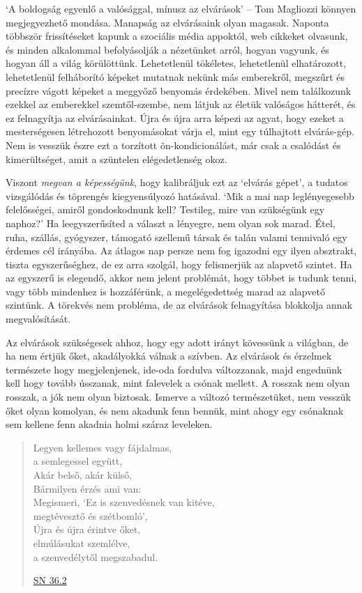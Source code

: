 `A boldogság egyenlő a valósággal, mínusz az elvárások' -- Tom Magliozzi
könnyen megjegyezhető mondása. Manapság az elvárásaink olyan magasak.
Naponta többször frissítéseket kapunk a szociális média appoktól, web
cikkeket olvasunk, és minden alkalommal befolyásolják a nézetünket
arról, hogyan vagyunk, és hogyan áll a világ körülöttünk. Lehetetlenül
tökéletes, lehetetlenül elhatározott, lehetetlenül felháborító képeket
mutatnak nekünk más emberekről, megszűrt és precízre vágott képeket a
meggyőző benyomás érdekében. Mivel nem találkozunk ezekkel az emberekkel
szemtől-szembe, nem látjuk az életük valóságos hátterét, és ez
felnagyítja az elvárásainkat. Újra és újra arra képezi az agyat, hogy
ezeket a mesterségesen létrehozott benyomásokat várja el, mint egy
túlhajtott elvárás-gép. Nem is vesszük észre ezt a torzított
ön-kondicionálást, már csak a csalódást és kimerültséget, amit a
szüntelen elégedetlenség okoz.

Viszont \emph{megvan a képességünk}, hogy kalibráljuk ezt az `elvárás
gépet', a tudatos vizsgálódás és töprengés kiegyensúlyozó hatásával.
`Mik a mai nap leglényegesebb felelősségei, amiről gondoskodnunk kell?
Testileg, mire van szükségünk egy naphoz?' Ha leegyszerűsíted a választ
a lényegre, nem olyan sok marad. Étel, ruha, szállás, gyógyszer,
támogató szellemű társak és talán valami tennivaló egy érdemes cél
irányába. Az átlagos nap persze nem fog igazodni egy ilyen absztrakt,
tiszta egyszerűséghez, de ez arra szolgál, hogy felismerjük az alapvető
szintet. Ha az egyszerű is elegendő, akkor nem jelent problémát, hogy
többet is tudunk tenni, vagy több mindenhez is hozzáférünk, a
megelégedettség marad az alapvető szintünk. A törekvés nem probléma, de
az elvárások felnagyítása blokkolja annak megvalósítását.

Az elvárások szükségesek ahhoz, hogy egy adott irányt kövessünk a
világban, de ha nem értjük őket, akadályokká válnak a szívben. Az
elvárások és érzelmek természete hogy megjelenjenek, ide-oda fordulva
változzanak, majd engednünk kell hogy tovább ússzanak, mint falevelek a
csónak mellett. A rosszak nem olyan rosszak, a jók nem olyan biztosak.
Ismerve a változó természetüket, nem vesszük őket olyan komolyan, és nem
akadunk fenn bennük, mint ahogy egy csónaknak sem kellene fenn akadnia
holmi száraz leveleken.

\begin{quote}
Legyen kellemes vagy fájdalmas,\\
a semlegessel együtt,\\
Akár belső, akár külső,\\
Bármilyen érzés ami van:\\
Megismeri, `Ez is szenvedésnek van kitéve,\\
megtévesztő és szétbomló',\\
Újra és újra érintve őket,\\
elmúlásukat szemlélve,\\
a szenvedélytől megszabadul.

\href{https://suttacentral.net/sn36.2/pli/ms}{SN 36.2}
\end{quote}

